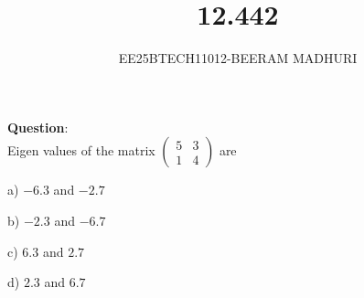 \documentclass[journal]{IEEEtran}
\begin{document}

\vspace{3cm}

\title{12.442}
\author{EE25BTECH11012-BEERAM MADHURI}
{\let\newpage\relax\maketitle}

\renewcommand{\thefigure}{\theenumi}
\renewcommand{\thetable}{\theenumi}
\setlength{\intextsep}{10pt} %


\renewcommand{\thetable}{\theenumi}


\textbf{Question}:\\
 Eigen values of the matrix
$\begin{pmatrix}5 & 3 \\1 & 4\end{pmatrix}$
are

\begin{enumerate}
\begin{multicols}{4}
\item [a)] $-6.3$ and $-2.7$
\item [b)] $-2.3$ and $-6.7$
\item [c)] $6.3$ and $2.7$
\item [d)] $2.3$ and $6.7$
\end{multicols}
\end{enumerate}
\end{document}
